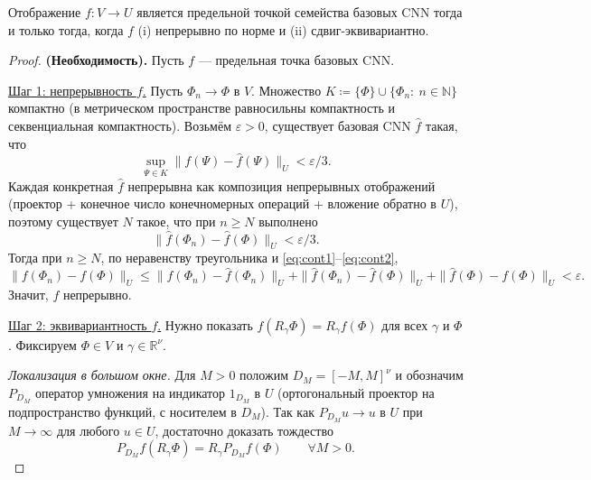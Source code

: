 \documentclass[../NDCNNAI_main.tex]{subfiles}
\begin{document}
\begin{theorem}
Отображение $f\colon V\to U$ является предельной точкой семейства базовых CNN
тогда и только тогда, когда $f$ (i) непрерывно по норме и (ii) сдвиг-эквивариантно.  
\end{theorem}

\begin{proof}
\textbf{(Необходимость).}
Пусть $f$ --- предельная точка базовых CNN.

\underline{Шаг 1: непрерывность $f$.}
Пусть $\Phi_n\to\Phi$ в $V$. Множество
\(
K\coloneq \{\Phi\}\cup\{\Phi_n:\ n\in\mathbb{N}\}
\)
компактно (в метрическом пространстве равносильны компактность и секвенциальная компактность).
Возьмём $\varepsilon>0$, существует базовая CNN $\widehat f$ такая, что
\begin{equation}
\sup_{\Psi\in K}\|f(\Psi)-\widehat f(\Psi)\|_U<\varepsilon/3.
\label{eq:cont1}  
\end{equation}
Каждая конкретная $\widehat f$ непрерывна как композиция непрерывных отображений
(проектор + конечное число конечномерных операций + вложение обратно в $U$),
поэтому существует $N$ такое, что при $n\ge N$ выполнено
\begin{equation}
\|\widehat f(\Phi_n)-\widehat f(\Phi)\|_U<\varepsilon/3.
\label{eq:cont2}
\end{equation}
Тогда при $n\ge N$, по неравенству треугольника и \eqref{eq:cont1}--\eqref{eq:cont2},
\[
\|f(\Phi_n)-f(\Phi)\|_U
\le \|f(\Phi_n)-\widehat f(\Phi_n)\|_U
+\|\widehat f(\Phi_n)-\widehat f(\Phi)\|_U
+\|\widehat f(\Phi)-f(\Phi)\|_U
<\varepsilon.
\]
Значит, $f$ непрерывно.

\underline{Шаг 2: эквивариантность $f$.}
Нужно показать $f(R_\gamma\Phi)=R_\gamma f(\Phi)$ для всех $\gamma$ и $\Phi$.
Фиксируем $\Phi\in V$ и $\gamma\in\mathbb{R}^\nu$.

\emph{Локализация в большом окне.}
Для $M>0$ положим $D_M=[-M,M]^\nu$ и обозначим $P_{D_M}$ оператор умножения на индикатор $1_{D_M}$ в $U$
(ортогональный проектор на подпространство функций, с носителем в $D_M$).
Так как $P_{D_M}u\to u$ в $U$ при $M\to\infty$ для любого $u\in U$, достаточно доказать тождество
\begin{equation}
P_{D_M}f(R_\gamma\Phi)=R_\gamma P_{D_M}f(\Phi)\qquad \forall M>0.
\label{eq:eq_goal_M}  
\end{equation}


\end{proof}
\end{document}
